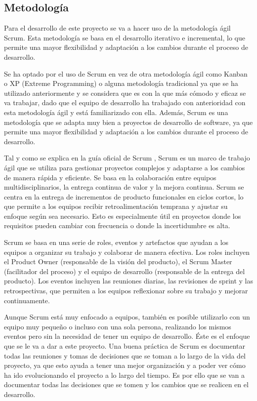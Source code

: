 \subsection{Metodología}
\label{sec:metodologia}

Para el desarrollo de este proyecto se va a hacer uso de la metodología ágil Scrum. Esta metodología se basa en el desarrollo iterativo e incremental, lo que permite una mayor flexibilidad y adaptación a los cambios durante el proceso de desarrollo.

Se ha optado por el uso de Scrum en vez de otra metodología ágil como Kanban o XP (Extreme Programming) o alguna metodología tradicional ya que se ha utilizado anteriormente y se considera que es con la que más cómodo y eficaz se va trabajar, dado que el equipo de desarrollo ha trabajado con anterioridad con esta metodología ágil y está familiarizado con ella.
Además, Scrum es una metodología que se adapta muy bien a proyectos de desarrollo de software, ya que permite una mayor flexibilidad y adaptación a los cambios durante el proceso de desarrollo.

Tal y como se explica en la guía oficial de Scrum \parencite{scrum-guide}, Scrum es un marco de trabajo ágil que se utiliza para gestionar proyectos complejos y adaptarse a los cambios de manera rápida y eficiente. Se basa en la colaboración entre equipos multidisciplinarios, la entrega continua de valor y la mejora continua.
Scrum se centra en la entrega de incrementos de producto funcionales en ciclos cortos, lo que permite a los equipos recibir retroalimentación temprana y ajustar su enfoque según sea necesario. Esto es especialmente útil en proyectos donde los requisitos pueden cambiar con frecuencia o donde la incertidumbre es alta.

Scrum se basa en una serie de roles, eventos y artefactos que ayudan a los equipos a organizar su trabajo y colaborar de manera efectiva. Los roles incluyen el Product Owner (responsable de la visión del producto), el Scrum Master (facilitador del proceso) y el equipo de desarrollo (responsable de la entrega del producto). Los eventos incluyen las reuniones diarias, las revisiones de sprint y las retrospectivas, que permiten a los equipos reflexionar sobre su trabajo y mejorar continuamente.

Aunque Scrum está muy enfocado a equipos, también es posible utilizarlo con un equipo muy pequeño o incluso con una sola persona, realizando los mismos eventos pero sin la necesidad de tener un equipo de desarrollo.
Éste es el enfoque que se le va a dar a este proyecto. Una buena práctica de Scrum es documentar todas las reuniones y tomas de decisiones que se toman a lo largo de la vida del proyecto, ya que esto ayuda a tener una mejor organización y a poder ver cómo ha ido evolucionando el proyecto a lo largo del tiempo.
Es por ello que se van a documentar todas las decisiones que se tomen y los cambios que se realicen en el desarrollo.


